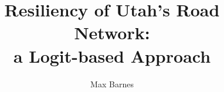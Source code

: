 \documentclass[12pt,twoside]{report}%
\begin{document}
\title{Resiliency of Utah's Road Network:\\a Logit-based Approach}%
\author{Max Barnes}

\showBYUHeader







\cleardoublepage

%
%
\end{document}
